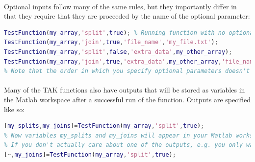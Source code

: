 \paragraph{}Optional inputs follow many of the same rules, but they importantly differ in that they require that they are proceeded by the name of the optional parameter:

\begin{lstlisting}[language=Matlab]
% From the header of TestFunction, you learn that it has three required inputs, 1) data, which expects a Matlab array, 2) method, which specifies a method to use on the data that is either 'split' or 'join', and 3) save_output, which expects a logical value. TestFunction also has two optional parameters, 1) file_name, which expects the name of the file to be output and 2) extra_data, which expects another Matlab array. All of the following are valid calls to TestFunction
TestFunction(my_array,'split',true); % Running function with no optional inputs
TestFunction(my_array,'join',true,'file_name','my_file.txt');
TestFunction(my_array,'split',false,'extra_data',my_other_array);
TestFunction(my_array,'join',true,'extra_data',my_other_array,'file_name','my_file.txt');
% Note that the order in which you specify optional parameters doesn't matter, but the argument passed to an optional parameter must always immediately follow the name of the appropriate optional parameter
\end{lstlisting}

\paragraph{}Many of the TAK functions also have outputs that will be stored as variables in the Matlab workspace after a successful run of the function. Outputs are specified like so:

\begin{lstlisting}[language=Matlab]
% The header indicates that TestFunction from the previous example has two outputs, split_data and joined_data, you can specify the name of the variables for these outputs
[my_splits,my_joins]=TestFunction(my_array,'split',true);
% Now variables my_splits and my_joins will appear in your Matlab workspace
% If you don't actually care about one of the outputs, e.g. you only want my_joins, you can supply a ~ to any output you don't want to be output to the workspace
[~,my_joins]=TestFunction(my_array,'split',true);
\end{lstlisting}

